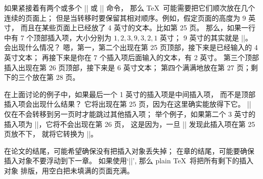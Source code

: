 \danger 如果紧接着有两个或多个 |\topinsert| 或 |\pageinsert| 命令，
那么 \TeX\ 可能需要把它们顺次放在几个连续的页面上；
但是当转移时要保留其相对顺序。例如，假定页面的高度为 9 英寸，
而且在某些页面上已经放了 4 英寸的文本。比如第 25 页。%
那么，如果一行中有 7 个顶部插入项，大小分别为 $1,2,3,9,3,2,1$ 英寸；
9 英寸的其实就是 |\pageinsert|。会出现什么情况？
嗯，第一，第二个出现在第 25 页顶部，接下来是已经输入的 4 英寸文本；
再接下来是你在 7 个插入项后面输入的文本，有 2 英寸。%
第三个顶部插入出现在第 26 页顶部，接下来是 6 英寸文本；
第四个满满地放在第 27 页；剩下的三个放在第 28 页。

\dangerexercise 在上面讨论的例子中，如果最后一个 1 英寸的插入项是中间插入项，
而不是顶部插入项会出现什么结果？
\answer \1它将出现在第 25 页，因为在这里确实能放得下它。
|\midinsert| 仅在不会转移到另一页时才能跳过其他插入项；
举个例子，如果第二个 3 英寸的插入项为 |\midinsert|，它将不会出现在第 26 页，
这是因为，一旦 |\midinsert| 发现此插入项在第 25 页放不下，
就将它转换为 |\topinsert|。

\danger 在论文的结尾，可能希望确保没有把插入对象丢失掉；
在章的结尾，可能要确保插入对象不要浮动到下一章。%
如果使用`|\vfill\supereject|', 那么 plain \TeX\ 将把所有剩下的插入对象%
排版，用空白把未填满的页面充满。

